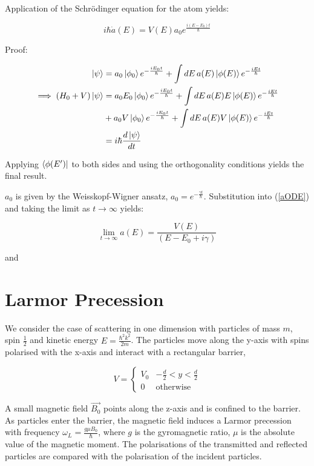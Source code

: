 \documentclass{article}
\begin{document}
\noindent Application of the Schr{\"o}dinger equation for the atom yields:

\begin{equation}
	i\hbar \dot{a}(E) = V(E)a_0e^{\frac{i(E-E_0)t}{\hbar}}
	\label{aODE}
\end{equation}

\noindent Proof:

\begin{align}
	\ket{\psi} &= a_0\ket{\phi_0}e^{-\frac{iE_0t}{\hbar}}+\int dE\,a(E)\ket{\phi(E)}e^{-\frac{iEt}{\hbar}} \\
	\implies (H_0+V)\ket{\psi} &= a_0E_0\ket{\phi_0}e^{-\frac{iE_0t}{\hbar}}+\int dE\, a(E)E\ket{\phi(E)}e^{-\frac{iEt}{\hbar}} \\ 
				   &+a_0V\ket{\phi_0}e^{-\frac{iE_0t}{\hbar}}+\int dE\, a(E)V\ket{\phi(E)}e^{-\frac{iEt}{\hbar}} \nonumber\\
				   &= i\hbar \frac{d\ket{\psi}}{dt}
\end{align}

\noindent Applying $\bra{\phi(E')}$ to both sides and using the orthogonality conditions yields the final result.

\noindent $a_0$ is given by the Weisskopf-Wigner ansatz, $a_0 = e^{-\frac{\gamma t}{\hbar}}$. Substitution into (\ref{aODE}) and taking the limit as $t \rightarrow \infty$ yields:

\begin{equation}
	\lim_{t\to\infty}a(E) = \frac{V(E)}{(E-E_0+i\gamma)}
\end{equation}

\noindent and 

\section{Larmor Precession}

We consider the case of scattering in one dimension with particles of mass $m$, spin $\frac{1}{2}$ and kinetic energy $
E = \frac{\hbar^2k^2}{2m}$. The particles move along the y-axis with spins polarised with the x-axis and interact with a rectangular barrier,

\begin{equation}
	V = 
	\begin{cases}
	V_0 & -\frac{d}{2}<y<\frac{d}{2}\\
		0 & \text{otherwise}
	\end{cases}
\end{equation}

A small magnetic field $\vec{B_{0}}$ points along the z-axis and is confined to the barrier. As particles enter the barrier, the magnetic field induces a Larmor precession with frequency $\omega_{L}=\frac{g \mu B_{0}}{\hbar}$, where $g$ is the gyromagnetic ratio, $\mu$ is the absolute value of the magnetic moment. The polarisations of the transmitted and reflected particles are compared with the polarisation of the incident particles.
\end{document}
